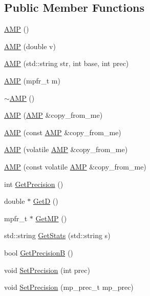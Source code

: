 \subsection*{Public Member Functions}
\begin{DoxyCompactItemize}
\item 
\hyperlink{class_a_m_p_adee66e9c3e14bcda4e0f9ad41e1e0335}{A\+M\+P} ()
\item 
\hyperlink{class_a_m_p_a481ad3a03f94b3b94568bb9eac1fb466}{A\+M\+P} (double v)
\item 
\hyperlink{class_a_m_p_af2718e09eaedb9bbf3a28bd260c6d8b6}{A\+M\+P} (std\+::string str, int base, int prec)
\item 
\hyperlink{class_a_m_p_a82233ee7f6ef6d3a60de4c26577c3dfd}{A\+M\+P} (mpfr\+\_\+t m)
\item 
\hyperlink{class_a_m_p_a8d3bb5485998c3eb4fd8440ad13ed1af}{$\sim$\+A\+M\+P} ()
\item 
\hyperlink{class_a_m_p_a1489b5bcd791211890e96be541f45693}{A\+M\+P} (\hyperlink{class_a_m_p}{A\+M\+P} \&copy\+\_\+from\+\_\+me)
\item 
\hyperlink{class_a_m_p_a979411a214a965c50b60a95eda1ea78e}{A\+M\+P} (const \hyperlink{class_a_m_p}{A\+M\+P} \&copy\+\_\+from\+\_\+me)
\item 
\hyperlink{class_a_m_p_a4a2d7e847c333daf12a1b957adbb9a62}{A\+M\+P} (volatile \hyperlink{class_a_m_p}{A\+M\+P} \&copy\+\_\+from\+\_\+me)
\item 
\hyperlink{class_a_m_p_a499d42ec7afbb99db2d9ba32cf98f98d}{A\+M\+P} (const volatile \hyperlink{class_a_m_p}{A\+M\+P} \&copy\+\_\+from\+\_\+me)
\item 
int \hyperlink{class_a_m_p_ab19be67af62d854d022ee53921953167}{Get\+Precision} ()
\item 
double $\ast$ \hyperlink{class_a_m_p_abc7e1b7d895d542da54e332ec461f07f}{Get\+D} ()
\item 
mpfr\+\_\+t $\ast$ \hyperlink{class_a_m_p_a3f39697c054b30f4637923b45aac9795}{Get\+M\+P} ()
\item 
std\+::string \hyperlink{class_a_m_p_aa376d6c4be6390e62c274eeeef4fbd12}{Get\+Stats} (std\+::string s)
\item 
bool \hyperlink{class_a_m_p_afd0da25041946d69753f2cdf6b2a5065}{Get\+Precision\+B} ()
\item 
void \hyperlink{class_a_m_p_ab098ea8e83660764f2f2110aa4ea739f}{Set\+Precision} (int prec)
\item 
void \hyperlink{class_a_m_p_a7d3f8c20b06a72cd4f7b8300aae45e6d}{Set\+Precision} (mp\+\_\+prec\+\_\+t mp\+\_\+prec)

\end{DoxyCompactItemize}
